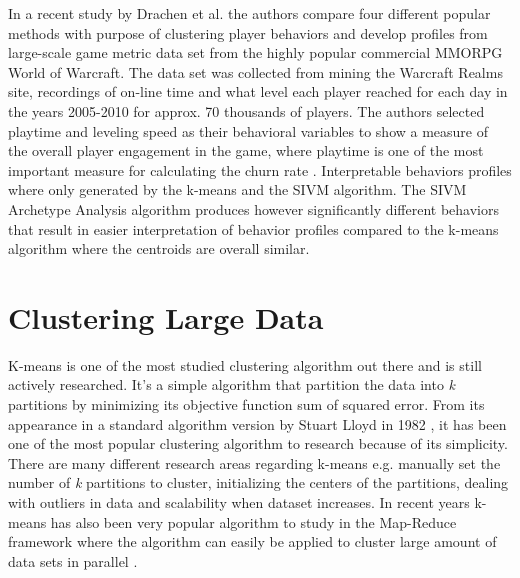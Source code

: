 In a recent study by Drachen et al. \citep{Drachen:2013} the authors compare four different popular methods with purpose of clustering player behaviors and develop profiles from large-scale game metric data set from the highly popular commercial MMORPG World of Warcraft. The data set was collected from mining the Warcraft Realms site, recordings of on-line time and what level each player reached for each day in the years 2005-2010 for approx. 70 thousands of players. The authors selected playtime and leveling speed as their behavioral variables to show a measure of the overall player engagement in the game, where playtime is one of the most important measure for calculating the churn rate \citep{Fields:2011SocialGame, Seif:2013GameAnalytics}. Interpretable behaviors profiles where only generated by the k-means and the SIVM algorithm. The SIVM Archetype Analysis algorithm produces however significantly different behaviors that result in easier interpretation of behavior profiles compared to the k-means algorithm where the centroids are overall similar.	

\section{Clustering Large Data}
K-means is one of the most studied clustering algorithm out there and is still actively researched. It's a simple algorithm that partition the data into \textit{k} partitions by minimizing its objective function sum of squared error. From its appearance in a standard algorithm version by Stuart Lloyd in 1982 \citep{Lloyd:1982}, it has been one of the most popular clustering algorithm to research because of its simplicity. There are many different research areas regarding k-means e.g. manually set the number of \textit{k} partitions to cluster, initializing the centers of the partitions, dealing with outliers in data and scalability when dataset increases. In recent years k-means has also been very popular algorithm to study in the Map-Reduce framework where the algorithm can easily be applied to cluster large amount of data sets in parallel \citep{Dean:2004}.

